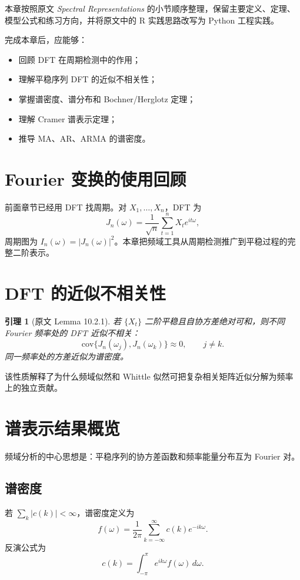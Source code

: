 \documentclass[11pt,a4paper,openany]{ctexbook}
\newtheorem{lemma}{引理}[section]
\begin{document}
本章按照原文 \textit{Spectral Representations} 的小节顺序整理，保留主要定义、定理、模型公式和练习方向，并将原文中的 R 实践思路改写为 Python 工程实践。

完成本章后，应能够：
\begin{itemize}
  \item 回顾 DFT 在周期检测中的作用；
  \item 理解平稳序列 DFT 的近似不相关性；
  \item 掌握谱密度、谱分布和 Bochner/Herglotz 定理；
  \item 理解 Cramer 谱表示定理；
  \item 推导 MA、AR、ARMA 的谱密度。
\end{itemize}

\section{Fourier 变换的使用回顾}

前面章节已经用 DFT 找周期。对 \(X_1,\ldots,X_n\)，DFT 为
\[
  J_n(\omega)=\frac1{\sqrt n}\sum_{t=1}^n X_t e^{it\omega},
\]
周期图为 \(I_n(\omega)=|J_n(\omega)|^2\)。本章把频域工具从周期检测推广到平稳过程的完整二阶表示。

\section{DFT 的近似不相关性}

\begin{lemma}[原文 Lemma 10.2.1]
若 \(\{X_t\}\) 二阶平稳且自协方差绝对可和，则不同 Fourier 频率处的 DFT 近似不相关：
\[
  \mathrm{cov}\{J_n(\omega_j),J_n(\omega_k)\}\approx0,\qquad j\ne k.
\]
同一频率处的方差近似为谱密度。
\end{lemma}

该性质解释了为什么频域似然和 Whittle 似然可把复杂相关矩阵近似分解为频率上的独立贡献。

\section{谱表示结果概览}

频域分析的中心思想是：平稳序列的协方差函数和频率能量分布互为 Fourier 对。

\subsection{谱密度}

若 \(\sum_k|c(k)|<\infty\)，谱密度定义为
\[
  f(\omega)=\frac1{2\pi}\sum_{k=-\infty}^{\infty}c(k)e^{-ik\omega}.
\]
反演公式为
\[
  c(k)=\int_{-\pi}^{\pi}e^{ik\omega}f(\omega)\,d\omega.
\]
\end{document}

